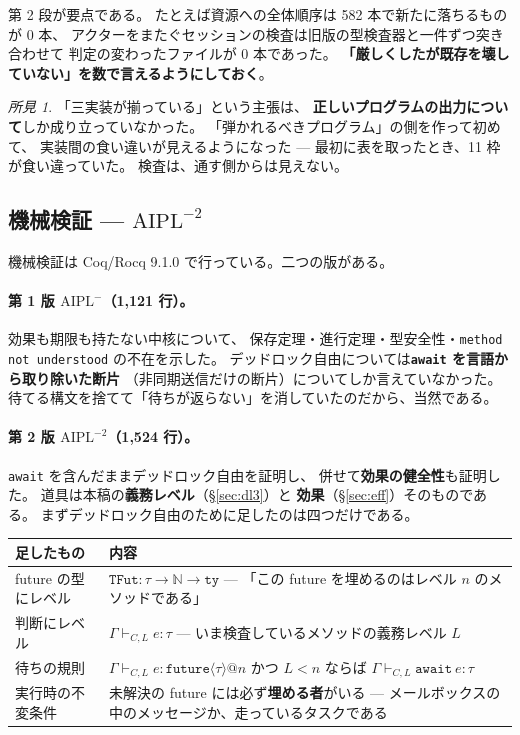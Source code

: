 \documentclass[11pt,a4paper]{ltjsarticle}
\theoremstyle{definition}
\theoremstyle{remark}
\newtheorem{finding}[theorem]{所見}
\begin{document}
第 2 段が要点である。
たとえば資源への全体順序は 582 本で新たに落ちるものが 0 本、
アクターをまたぐセッションの検査は旧版の型検査器と一件ずつ突き合わせて
判定の変わったファイルが 0 本であった。
\textbf{「厳しくしたが既存を壊していない」を数で言えるようにしておく}。

\begin{finding}
「三実装が揃っている」という主張は、
\textbf{正しいプログラムの出力について}しか成り立っていなかった。
「弾かれるべきプログラム」の側を作って初めて、
実装間の食い違いが見えるようになった ---
最初に表を取ったとき、11 枠が食い違っていた。
検査は、通す側からは見えない。
\end{finding}

\subsection{機械検証 --- $\mathrm{AIPL}^{-2}$}
\label{sec:coq}

機械検証は Coq/Rocq 9.1.0 で行っている。二つの版がある。

\paragraph{第 1 版 $\mathrm{AIPL}^{-}$（1{,}121 行）。}
効果も期限も持たない中核について、
保存定理・進行定理・型安全性・\texttt{method not understood} の不在を示した。
デッドロック自由については\textbf{\texttt{await} を言語から取り除いた断片}
（非同期送信だけの断片）についてしか言えていなかった。
待てる構文を捨てて「待ちが返らない」を消していたのだから、当然である。

\paragraph{第 2 版 $\mathrm{AIPL}^{-2}$（1{,}524 行）。}
\texttt{await} を含んだままデッドロック自由を証明し、
併せて\textbf{効果の健全性}も証明した。
道具は本稿の\textbf{義務レベル}（\S\ref{sec:dl3}）と
\textbf{効果}（\S\ref{sec:eff}）そのものである。
まずデッドロック自由のために足したのは四つだけである。

\begin{center}
\small
\begin{tabular}{p{}p{}}
\toprule
足したもの & 内容 \\
\midrule
future の型にレベル & $\mathtt{TFut} : \tau \to \mathbb{N} \to \mathtt{ty}$ ---
  「この future を埋めるのはレベル $n$ のメソッドである」 \\
判断にレベル & $\Gamma \vdash_{C,L} e : \tau$ ---
  いま検査しているメソッドの義務レベル $L$ \\
待ちの規則 & $\Gamma \vdash_{C,L} e : \mathtt{future}\langle\tau\rangle@n$
  かつ $L < n$ ならば $\Gamma \vdash_{C,L} \mathtt{await}\ e : \tau$ \\
実行時の不変条件 & 未解決の future には必ず\textbf{埋める者}がいる ---
  メールボックスの中のメッセージか、走っているタスクである \\
\bottomrule
\end{tabular}
\end{center}
\end{document}
